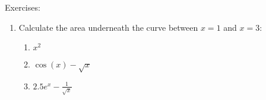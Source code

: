 \documentclass[../revisedmain.tex]{subfiles}
\begin{document}
	\begin{center}
		\LARGE Exercises:
	\end{center}
	\begin{enumerate}
		\item Calculate the area underneath the curve between $x=1$ and $x=3$:
		\begin{enumerate}
			\item $x^2$
			\item $\cos(x)-\sqrt{x}$
			\item $2.5e^x-\frac{1}{\sqrt{x}}$
		\end{enumerate}
	\end{enumerate}
\end{document}
